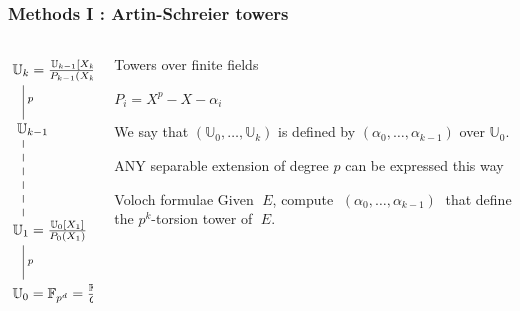 \documentclass[10pt]{beamer}
\newcommand{\U}{\mathbb{U}}  %
\newcommand{\F}{\mathbb{F}}  %
\newcommand{\0}{\mathcal{O}}  %
\begin{document}

\begin{frame}
  \frametitle{Methods I : Artin-Schreier towers}

  \begin{columns}
    \begin{column}{0.3\textwidth}
      \Large\[\xymatrix{
        *+[r]{\U_k = \frac{\U_{k-1}[X_k]}{P_{k-1}(X_k)}}\ar@{-}[d]^p\\
        *+[r]{\U_{k-1}} \ar@{--}[dd]\\
        \\
        *+[r]{\U_1 = \frac{\U_0[X_1]}{P_0(X_1)}} \ar@{-}[d]^p\\
        *+[r]{\U_0 = \F_{p^d} = \frac{\F_p[X_0]}{Q(X_0)}}
      }\]
    \end{column}
    \begin{column}{0.65\textwidth}
      \begin{block}{Towers over finite fields}
        \smallskip
        \begin{center}
          \Large$P_i = X^p - X - \alpha_i$
        \end{center}
        \vfill
        \begin{center}
          We say that $(\U_0,\ldots,\U_k)$ is defined by
          $(\alpha_0,\ldots,\alpha_{k-1})$ over $\U_0$.
        \end{center}
        \begin{center}
          \alert{ANY} separable extension of degree $p$ can be
          expressed this way
        \end{center}
      \end{block}

      \begin{block}{Voloch formulae}
        Given $\;E$, compute $\;(\alpha_0,\ldots,\alpha_{k-1})\;$ that
        define the $p^k$-torsion tower of $\;E$.
      \end{block}
    \end{column}
  \end{columns}
\end{frame}

\end{document}
